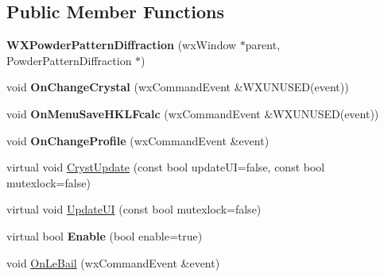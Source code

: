 \subsection*{Public Member Functions}
\begin{DoxyCompactItemize}
\item 
\mbox{\label{class_obj_cryst_1_1_w_x_powder_pattern_diffraction_a80b93a4fef92bd7d220c4ef68e7b2b96}} 
{\bfseries W\+X\+Powder\+Pattern\+Diffraction} (wx\+Window $\ast$parent, Powder\+Pattern\+Diffraction $\ast$)
\item 
\mbox{\label{class_obj_cryst_1_1_w_x_powder_pattern_diffraction_a06cb78cb0b2baabcfea21e033aa9b883}} 
void {\bfseries On\+Change\+Crystal} (wx\+Command\+Event \&W\+X\+U\+N\+U\+S\+ED(event))
\item 
\mbox{\label{class_obj_cryst_1_1_w_x_powder_pattern_diffraction_ae1d383b5f8652c8afc532b6cda85b028}} 
void {\bfseries On\+Menu\+Save\+H\+K\+L\+Fcalc} (wx\+Command\+Event \&W\+X\+U\+N\+U\+S\+ED(event))
\item 
\mbox{\label{class_obj_cryst_1_1_w_x_powder_pattern_diffraction_af5fc36c337651fa01199564e25ef0e58}} 
void {\bfseries On\+Change\+Profile} (wx\+Command\+Event \&event)
\item 
virtual void \mbox{\hyperlink{class_obj_cryst_1_1_w_x_powder_pattern_diffraction_a1da4c9c31433e1cee6bf77afca30818e}{Cryst\+Update}} (const bool update\+UI=false, const bool mutexlock=false)
\item 
virtual void \mbox{\hyperlink{class_obj_cryst_1_1_w_x_powder_pattern_diffraction_acc1ee5836a4db2466007fe9ebb540e01}{Update\+UI}} (const bool mutexlock=false)
\item 
\mbox{\label{class_obj_cryst_1_1_w_x_powder_pattern_diffraction_ac58d056f13a0f4b2799c704d20eca04f}} 
virtual bool {\bfseries Enable} (bool enable=true)
\item 
\mbox{\label{class_obj_cryst_1_1_w_x_powder_pattern_diffraction_a1908f947ba675ae16a6b620286c0b0ae}} 
void \mbox{\hyperlink{class_obj_cryst_1_1_w_x_powder_pattern_diffraction_a1908f947ba675ae16a6b620286c0b0ae}{On\+Le\+Bail}} (wx\+Command\+Event \&event)

\end{DoxyCompactItemize}
